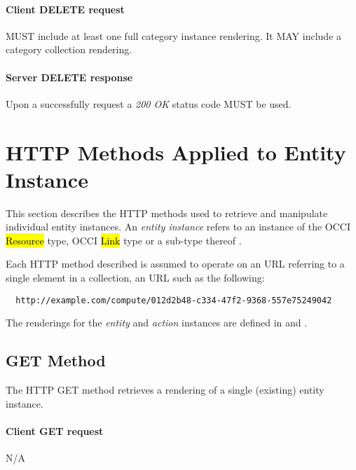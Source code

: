 \documentclass[10pt,a4paper]{article}
\begin{document}
\paragraph{Client DELETE request}
MUST include at least one full category instance rendering. It MAY include a category collection rendering.

\paragraph{Server DELETE response}
Upon a successfully request a \emph{200 OK} status code MUST be used.

\section{HTTP Methods Applied to Entity Instance}





This section describes the HTTP methods used to retrieve and manipulate
individual entity instances. An {\em entity instance} refers to an instance
of the OCCI \hl{Resource} type, OCCI \hl{Link} type or a sub-type thereof
\cite{occi:core}.

Each HTTP method described is assumed to operate
on an URL referring to a single element in a collection, an URL such as the
following:
\begin{verbatim}
  http://example.com/compute/012d2b48-c334-47f2-9368-557e75249042
\end{verbatim}

The renderings for the {\em entity} and {\em action} instances are defined in \cite{occi:text} and \cite{occi:json}.

\subsection{GET Method}
The HTTP GET method retrieves a rendering of a single (existing) entity instance.

\paragraph{Client GET request}
N/A
\end{document}
